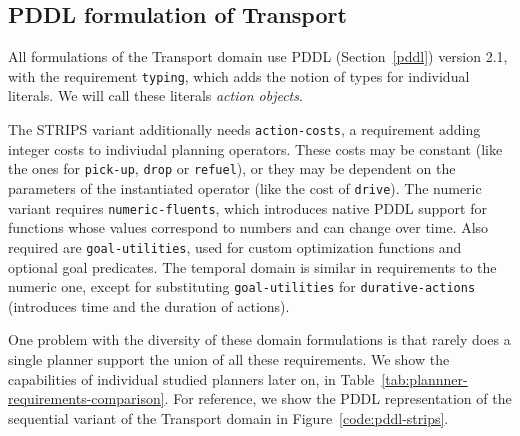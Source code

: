 \subsection{PDDL formulation of Transport}

All formulations of the Transport domain use PDDL (Section~\ref{pddl}) version 2.1,
with the requirement \verb+typing+, which adds the notion of types for individual
literals. We will call these literals \textit{action objects}.

The STRIPS variant additionally needs \verb+action-costs+, a requirement adding
integer costs to indiviudal planning operators. These costs may be constant
(like the ones for \verb+pick-up+, \verb+drop+ or \verb+refuel+),
or they may be dependent on the parameters of the instantiated operator (like
the cost of \verb+drive+).
The numeric variant
requires \verb+numeric-fluents+, which introduces native PDDL support for functions whose values correspond to numbers and can change over time. Also required are
\verb+goal-utilities+, used for custom optimization functions and optional goal predicates.
The temporal domain is similar in requirements to the numeric one, except for
substituting \verb+goal-utilities+ for \verb+durative-actions+ (introduces time
and the duration of actions).

One problem with the diversity of these domain formulations is that rarely does
a single planner support the union of all these requirements.
We show the capabilities of individual studied planners
later on, in Table~\ref{tab:plannner-requirements-comparison}.
For reference, we show the PDDL representation of the sequential variant of
the Transport domain in Figure~\ref{code:pddl-strips}.

